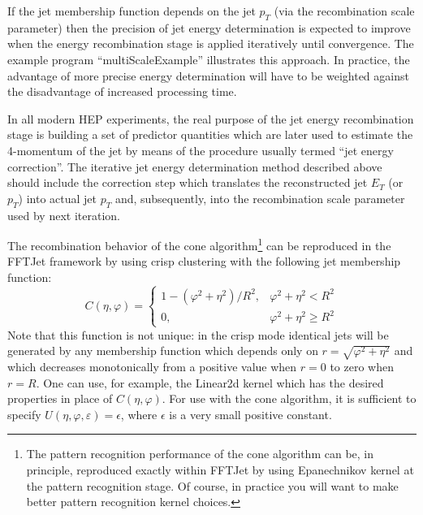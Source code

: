\documentclass[epsf,12pt,titlepage]{article}
\newcommand{\cname}[1]{\index{#1}\textsf{#1}}
\begin{document}
If the jet membership function depends
on the jet $p_T$ (via the recombination scale parameter) then the
precision of jet energy determination is expected to improve when
the energy recombination stage is applied iteratively until
convergence.
The example program ``multiScaleExample'' illustrates this approach.
In practice, the advantage of more precise energy determination
will have to be weighted against the disadvantage of increased processing time.

In all modern HEP experiments, the real purpose
of the jet energy recombination
stage is
building a set of predictor quantities which are later used to
estimate the 4-momentum of the jet by means of the procedure usually
termed ``jet energy correction''. The iterative jet energy
determination method described above should include the correction step
which translates the reconstructed jet $E_T$ (or $p_T$) into actual
jet $p_T$ and, subsequently, into the recombination scale parameter
used by next iteration.

The recombination behavior of the cone algorithm\footnote{The pattern
recognition performance of the cone algorithm can be, in principle,
reproduced exactly within FFTJet by using Epanechnikov kernel at the pattern
recognition stage. Of course,
in practice you will want to make better pattern recognition kernel choices.}
can be reproduced
in the FFTJet framework by using crisp clustering with the following
jet membership function:
$$
C(\eta, \varphi) = \left\{ \begin{array}{ll}
                           1 - (\varphi^2 + \eta^2)/R^2, & \varphi^2 + \eta^2 < R^2\\
                           0, & \varphi^2 + \eta^2 \ge R^2
                           \end{array}
                       \right.
$$
Note that this function is not unique: in the crisp mode
identical jets will be generated by any membership function
which depends only on $r = \sqrt{\varphi^2 + \eta^2}$ and which
decreases monotonically from a positive value when $r = 0$ to zero 
when $r = R$. One can use, for example, the \cname{Linear2d} kernel
which has the desired properties in place of $C(\eta, \varphi)$.
For use with the cone algorithm, it is sufficient to specify
$U(\eta, \varphi, \varepsilon) = \epsilon$, where $\epsilon$ is a
very small positive constant.
\end{document}
